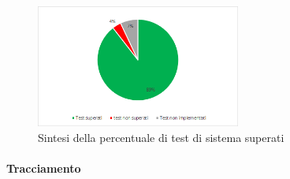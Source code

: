 \begin{figure}[H]
\centering 
\includegraphics[width=0.6\textwidth]{Images/TS.png}
\caption{Sintesi della percentuale di test di sistema superati}
\label{TS} 
\end{figure}
    
    \paragraph{Tracciamento} \Spazio
    
